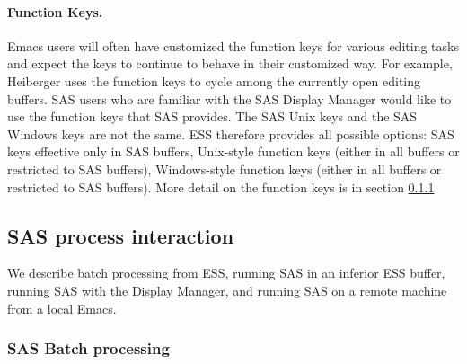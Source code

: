 \documentclass{article}
\begin{document}
\paragraph{Function Keys.}
Emacs users will often have customized the function keys for various
editing tasks and expect the keys to continue to behave in their
customized way.  For example, Heiberger uses the function keys to
cycle among the currently open editing buffers.  SAS users who are
familiar with the SAS Display Manager would like to use the function
keys that SAS provides.  The SAS Unix keys and the SAS Windows keys
are not the same.  ESS therefore provides all possible options: SAS
keys effective only in SAS buffers, Unix-style function keys (either
in all buffers or restricted to SAS buffers), Windows-style function
keys (either in all buffers or restricted to SAS buffers).
More detail on the function keys is in section \ref{sec:SAS:proc:batch}


\subsection{SAS process interaction}
\label{sec:SAS:proc}

We describe batch processing from ESS, running SAS in an inferior ESS buffer,
running SAS with the Display Manager,
and running SAS on a remote machine from a local Emacs.

\subsubsection{SAS Batch processing}
\label{sec:SAS:proc:batch}
\end{document}
